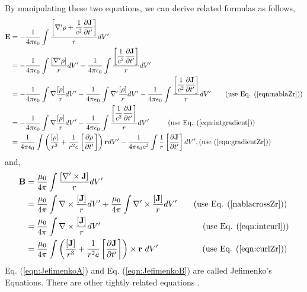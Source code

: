 \documentclass[11pt]{article}              %
\begin{document}
By manipulating these two equations, we can derive related formulas as follows,
\begin{align}
    {\mathbf E}&=-\frac{1}{4\pi\epsilon_0}\int\frac{\left[\nabla^\prime\rho+\dfrac{1}{c^2}\dfrac{\partial {\mathbf J}}{\partial t^\prime}\right]}{r}dV^\prime\notag\\%
    &=-\frac{1}{4\pi\epsilon_0}\int\frac{\left[\nabla^\prime\rho\right]}{r}dV^\prime
    -\frac{1}{4\pi\epsilon_0}\int\frac{\left[\dfrac{1}{c^2}\dfrac{\partial {\mathbf J}}{\partial t^\prime}\right]}{r}dV^\prime\notag\\
    &=-\frac{1}{4\pi\epsilon_0}\int\nabla\frac{\left[\rho\right]}{r}dV^\prime-\frac{1}{4\pi\epsilon_0}\int\nabla^\prime\frac{\left[\rho\right]}{r}dV^\prime-\frac{1}{4\pi\epsilon_0}\int\frac{\left[\dfrac{1}{c^2}\dfrac{\partial {\mathbf J}}{\partial t^\prime}\right]}{r}dV^\prime\tag{use Eq. (\ref{eqn:nablaZr})}\\
    &=-\frac{1}{4\pi\epsilon_0}\int\nabla\frac{\left[\rho\right]}{r}dV^\prime
    -\frac{1}{4\pi\epsilon_0}\int\frac{\left[\dfrac{1}{c^2}\dfrac{\partial {\mathbf J}}{\partial t^\prime}\right]}{r}dV^\prime\ \ \ \ \ \ \ \ \mbox{(use Eq. (\ref{eqn:intgradient})})\label{eqn:Epotentialpre}\\
    &=\frac{1}{4\pi\epsilon_0}\int\left(\frac{[\rho]}{r^3}+\frac{1}{r^2 c}\left[\frac{\partial \rho}{\partial t^\prime}\right]\right){\mathbf r}d V^\prime-\frac{1}{4\pi\epsilon_0 c^2}\int\frac{1}{r}\left[\dfrac{\partial {\mathbf J}}{\partial t^\prime}\right]dV^\prime,
    \mbox{(use (\ref{eqn:gradientZr}))}\label{eqn:JefimenkoA}
\end{align}
and,
\begin{align}
    {\mathbf B}&=\frac{\mu_0}{4\pi}\int\frac{[\nabla^\prime\times{\mathbf J}]}{r}dV^\prime\notag\\
    &=\frac{\mu_0}{4\pi}\int\nabla\times\frac{[{\mathbf J}]}{r}dV^\prime+\frac{\mu_0}{4\pi}\int\nabla^\prime\times\frac{[{\mathbf J}]}{r}dV^\prime\tag{use Eq. (\ref{nablacrossZr})}\\
    &=\frac{\mu_0}{4\pi}\int\nabla\times\frac{[{\mathbf J}]}{r}dV^\prime\ \ \ \ \ \ \ \ \ \ \ \ \ \ \ \ \ \ \ \ \ \ \ \ \ \ \ \ \ \ \ \ \ \ \ \ \ \mbox{(use Eq. (\ref{eqn:intcurl}))}\label{eqn:Bpotentialpre}\\
    &=\frac{\mu_0}{4\pi}\int\left(\frac{[\mathbf J]}{r^3}+\frac{1}{r^2c}\left[\frac{\partial{\mathbf J}}{\partial t^\prime}\right]\right)\times{\mathbf r}\ dV^\prime\ \ \ \ \ \ \ \ \ \ \ \ \ \ \ \ \mbox{(use Eq. (\ref{eqn:curlZr}))}\label{eqn:JefimenkoB}
\end{align}
Eq. (\ref{eqn:JefimenkoA}) and Eq. (\ref{eqn:JefimenkoB}) are called Jefimenko's Equations. There are other tightly related equations \cite{panofsky1962classical} \cite{mcdonald1997relation}.
\end{document}
